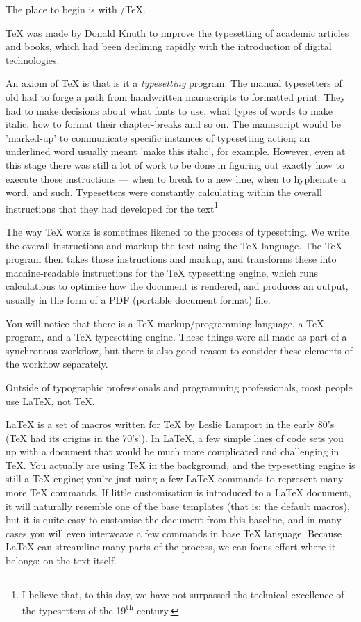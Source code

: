 \documentclass[11pt, oneside]{memoir}
\begin{document}
The place to begin is with /TeX{}.

TeX was made by Donald Knuth to improve the typesetting of academic articles and books, which had been declining rapidly with the introduction of digital technologies.

An axiom of \TeX{} is that is it a \emph{typesetting} program. The manual typesetters of old had to forge a path from handwritten manuscripts to formatted print. They had to make decisions about what fonts to use, what types of words to make italic, how to format their chapter-breaks and so on. The manuscript would be 'marked-up' to communicate specific instances of typesetting action; an underlined word usually meant 'make this italic', for example. However, even at this stage there was still a lot of work to be done in figuring out exactly how to execute those instructions — when to break to a new line, when to hyphenate a word, and such. Typesetters were constantly calculating within the overall instructions that they had developed for the text\footnote{I believe that, to this day, we have not surpassed the technical excellence of the typesetters of the 19\textsuperscript{th} century.}

The way TeX works is sometimes likened to the process of typesetting. We write the overall instructions and markup the text using the TeX language. The TeX program then takes those instructions and markup, and transforms these into machine-readable instructions for the TeX typesetting engine, which runs calculations to optimise how the document is rendered, and produces an output, usually in the form of a PDF (portable document format) file.

You will notice that there is a TeX markup/programming language, a TeX program, and a TeX typesetting engine. These things were all made as part of a synchronous workflow, but there is also good reason to consider these elements of the workflow separately.

Outside of typographic professionals and programming professionals, most people use \LaTeX{}, not \TeX{}.

LaTeX is a set of macros written for TeX by Leslie Lamport in the early 80's (TeX had its origins in the 70's!). In LaTeX, a few simple lines of code sets you up with a document that would be much more complicated and challenging in TeX. You actually are using TeX in the background, and the typesetting engine is still a TeX engine; you're just using a few LaTeX commands to represent many more TeX commands. If little customisation is introduced to a LaTeX document, it will naturally resemble one of the base templates (that is: the default macros), but it is quite easy to customise the document from this baseline, and in many cases you will even interweave a few commands in base TeX language. Because LaTeX can streamline many parts of the process, we can focus effort where it belongs: on the text itself.
\end{document}
